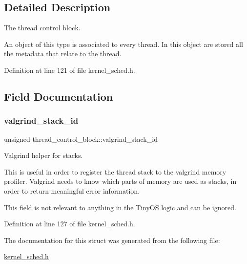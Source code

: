 \subsection{Detailed Description}
The thread control block. 

An object of this type is associated to every thread. In this object are stored all the metadata that relate to the thread. 

Definition at line 121 of file kernel\+\_\+sched.\+h.



\subsection{Field Documentation}
\mbox{\label{structthread__control__block_ad8a2da36c0ad775c12c5f66f4fec9d41}} 
\subsubsection{\texorpdfstring{valgrind\+\_\+stack\+\_\+id}{valgrind\_stack\_id}}
{\footnotesize\ttfamily unsigned thread\+\_\+control\+\_\+block\+::valgrind\+\_\+stack\+\_\+id}



Valgrind helper for stacks. 

This is useful in order to register the thread stack to the valgrind memory profiler. Valgrind needs to know which parts of memory are used as stacks, in order to return meaningful error information.

This field is not relevant to anything in the Tiny\+OS logic and can be ignored. 

Definition at line 127 of file kernel\+\_\+sched.\+h.



The documentation for this struct was generated from the following file\+:\begin{DoxyCompactItemize}
\item 
\hyperlink{kernel__sched_8h}{kernel\+\_\+sched.\+h}\end{DoxyCompactItemize}
